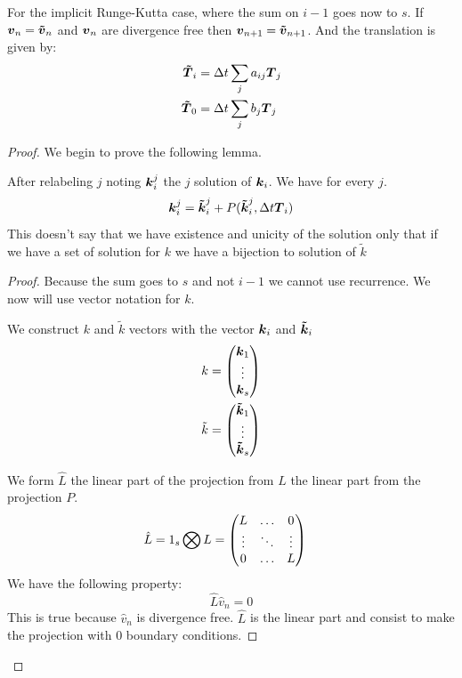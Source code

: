 \begin{theorem}
For the implicit Runge-Kutta case, where the sum on $i-1$ goes now to $s$.
If ${\boldsymbol {v}}_{n}={\boldsymbol {\tilde{v}}}_{n}$ and ${\boldsymbol {v}}_n$ are divergence free then ${\boldsymbol {v}}_{n+1}={\boldsymbol {\tilde{v}}}_{n+1}$.
And the translation is given by:
\begin{align}
  {\boldsymbol {\tilde{T}}}_{i}&=\Delta t\sum_{j}a_{ij}{\boldsymbol {T}}_{j}\\
  {\boldsymbol {\tilde{T}}}_{0}&=\Delta t\sum_{j}b_{j}{\boldsymbol {T}}_{j}
\end{align}

\end{theorem}
\begin{proof}
We begin to prove the following lemma.
\begin{lemma}
After relabeling $j$ noting ${\boldsymbol {k}}_{i}^{j}$ the $j$ solution of ${\boldsymbol {k}}_{i}$.
We have for every $j$.
\begin{equation}
  {\boldsymbol {k}}_{i}^{j}={\boldsymbol {\tilde{k}}}_{i}^{j}+P({\boldsymbol {\tilde{k}}}_{i}^{j},\Delta t {\boldsymbol {T}}_{i})
\end{equation}
This doesn't say that we have existence and unicity of the solution only that if we have a set of solution for $k$ we have a bijection
to solution of $\tilde{k}$
\end{lemma}
\begin{proof}
Because the sum goes to $s$ and not $i-1$ we cannot use recurrence.
We now will use vector notation for $k$.

We construct $k$ and $\tilde{k}$ vectors with the vector ${\boldsymbol {k}}_{i}$ and ${\boldsymbol {\tilde{k}}}_{i}$
\begin{align}
k&=\begin{pmatrix}
    {\boldsymbol {k}}_{1}\\
    \vdots\\
    {\boldsymbol {k}}_{s}\\
  \end{pmatrix}\\
\tilde{k}&=\begin{pmatrix}
    {\boldsymbol {\tilde{k}}}_{1}\\
    \vdots\\
    {\boldsymbol {\tilde{k}}}_{s}\\
  \end{pmatrix}
\end{align}

We form $\hat{L}$ the linear part of the projection from $L$ the linear part from the projection $P$.
\begin{align}
\hat{L}&=1_{s}\bigotimes L=\begin{pmatrix}L	&\ldots	&0\\
			\vdots &\ddots 	&\vdots\\
			0	&\ldots	&L\\
	\end{pmatrix}
\end{align}
We have the following property:
\begin{equation}
\hat{L}\hat{v}_{n}=0
\end{equation}
This is true because $\hat{v}_{n}$ is divergence free.
$\hat{L}$ is the linear part and consist to make the projection with 0 boundary conditions.


\end{proof}
\end{proof}
